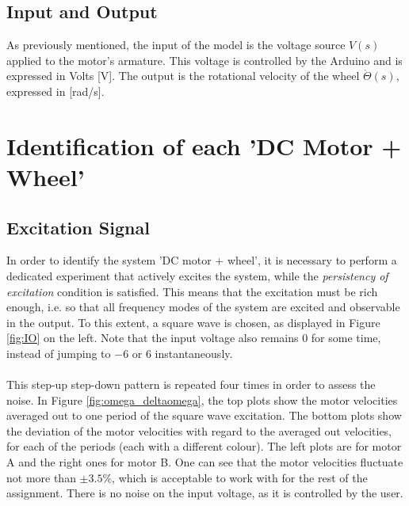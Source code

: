 \documentclass[a4paper,kul]{kulakarticle} %
\begin{document}

\subsection{Input and Output}
As previously mentioned, the input of the model is the voltage source $V(s)$ applied to the motor's armature. This voltage is controlled by the Arduino and is expressed in Volts [V]. The output is the rotational velocity of the wheel  $\dot{\Theta}(s)$, expressed in [rad/s].


\section{Identification of each 'DC Motor + Wheel'}
\subsection{Excitation Signal}
In order to identify the system 'DC motor + wheel', it is necessary to perform a dedicated experiment that actively excites the system, while the \textit{persistency of excitation} condition is satisfied. This means that the excitation must be rich enough, i.e. so that all frequency modes of the system are excited and observable in the output. To this extent, a square wave is chosen, as displayed in Figure \ref{fig:IO} on the left. Note that the input voltage also remains $0$ for some time, instead of jumping to $-6$ or $6$ instantaneously. 
\\\\
This step-up step-down pattern is repeated four times in order to assess the noise. In Figure \ref{fig:omega_deltaomega}, the top plots show the motor velocities averaged out to one period of the square wave excitation. The bottom plots show the deviation of the motor velocities with regard to the averaged out velocities, for each of the periods (each with a different colour). The left plots are for motor A and the right ones for motor B. One can see that the motor velocities fluctuate not more than $\pm 3.5\%$, which is acceptable to work with for the rest of the assignment. There is no noise on the input voltage, as it is controlled by the user.
\end{document}
